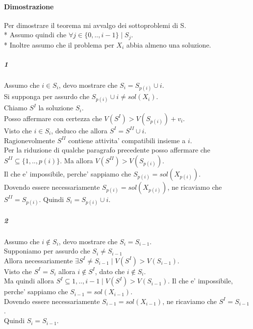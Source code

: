 \paragraph{Dimostrazione}

Per dimostrare il teorema mi avvalgo dei sottoproblemi di S. \\*
Assumo quindi che $\forall j \in \{0,..,i-1\} \mid S_j$. \\*
Inoltre assumo che il problema per $X_i$ abbia almeno una soluzione.

\subparagraph{1}

Assumo che $i \in S_i$, devo mostrare che $S_i = S_{p(i)} \cup {i}$. \\
Si supponga per assurdo che $S_{p(i)} \cup {i} \ne sol(X_i)$. \\
Chiamo $S^I$ la soluzione ${S_i}$. \\
Posso affermare con certezza che $V(S^I) > V(S_{p(i)}) + v_i$. \\
Visto che $i \in S_i$, deduco che allora $S^I = S^{II} \cup {i}$. \\
Ragionevolmente $S^{II}$ contiene attivita' compatibili insieme a $i$. \\
Per la riduzione di qualche paragrafo precedente posso affermare che $S^{II} \subseteq \{1,..,p(i)\}$.
Ma allora $V(S^{II}) > V(S_{p(i)})$. \\
Il che e' impossibile, perche' sappiamo che $S_{p(i)} = sol(X_{p(i)})$. \\
Dovendo essere necessariamente $S_{p(i)} = sol(X_{p(i)})$, ne ricaviamo che $S^{II} = S_{p(i)}$.
Quindi $S_i = S_{p(i)} \cup {i}$.

\subparagraph{2}

Assumo che $i \notin S_i$, devo mostrare che $S_i = S_{i-1}$. \\
Supponiamo per assurdo che $S_i \ne S_{i-1}$ \\
Allora necessariamente $\exists S^I \ne S_{i-1} \mid V(S^I) > V(S_{i-1})$. \\
Visto che $S^I = S_i$ allora $i \notin S^I$, dato che $i \notin S_i$. \\
Ma quindi allora $S^I \subseteq {1,..,i-1} \mid V(S^I) > V(S_{i-1})$.
Il che e' impossibile, perche' sappiamo che $S_{i-1} = sol(X_{i-1})$. \\
Dovendo essere necessariamente $S_{i-1} = sol(X_{i-1})$, ne ricaviamo che $S^{I} = S_{i-1}$. \\
Quindi $S_i = S_{i-1}$.

\newpage

